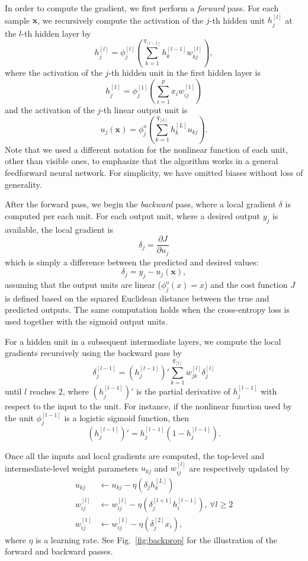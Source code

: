 \documentclass[dissertation,nocontribution,draft*]{aaltoseries}
\newcommand{\qlay}[1]{\left[#1\right]}
\newcommand{\vect}[1]{\mathbf{#1}}
\newcommand{\vx}[0]{\vect{x}}
\begin{document}
In order to compute the gradient, we first perform a
\textit{forward} pass. For each sample $\vx$, we recursively
compute the activation of the $j$-th hidden unit
$h_j^{\qlay{l}}$
at the $l$-th hidden layer by
\[
h_j^{\qlay{l}} = \phi_j^{\qlay{l}}
\left(\sum_{k=1}^{q_{\qlay{l-1}}} h_k^{\qlay{l-1}}
w_{kj}^{\qlay{l}}\right),
\]
where the activation of the $j$-th hidden unit in the first
hidden layer is
\[
h_j^{\qlay{1}} = \phi_j^{\qlay{1}} \left(\sum_{i=1}^p x_i
w_{ij}^{\qlay{1}}\right)
\]
and the activation of the $j$-th linear output unit is 
\[
u_j(\vx) = \phi_j^{o} \left( \sum_{k=1}^{q_{\qlay{L}}}
h_{k}^{\qlay{L}} u_{kj}
\right).
\]
Note that we used a different notation for the nonlinear
function of each unit, other than visible ones, to emphasize
that the algorithm works in a general feedforward neural
network. 
For simplicity, we have omitted biases without loss of
generality.

After the forward pass, we begin the \textit{backward} pass,
where a local gradient $\delta$ is computed per each unit.
For each output unit, where a desired output $y_j$ is
available, the local gradient is
\[
\delta_j = \frac{\partial J}{\partial u_j} 
\]
which is simply a difference between the predicted and
desired values:
\[
\delta_j = y_j - u_j(\vx),
\]
assuming that the output units are linear
($\phi_j^o(x) = x$) and the cost function $J$ is defined
based on the squared Euclidean distance between the true and
predicted outputs. The same computation holds when the
cross-entropy loss is used together with the sigmoid output
units.

For a hidden unit in a subsequent intermediate layers, we
compute the local gradients recursively using the backward
pass
by
\[
\delta_j^{\qlay{l-1}} = \left(h_j^{\qlay{l-1}}\right)'
\sum_{k=1}^{q_{\qlay{l}}}
w_{jk}^{\qlay{l}} \delta_j^{\qlay{l}}
\]
until $l$ reaches $2$, where $\left(h_j^{\qlay{l-1}}\right)'$ is
the partial derivative of $h_j^{\qlay{l-1}}$ with respect to the
input to the unit. For instance, if the nonlinear function
used by the unit $\phi_j^{\qlay{l-1}}$ is a logistic sigmoid
function, then
\[
\left(h_j^{\qlay{l-1}}\right)' = h_j^{\qlay{l-1}} \left( 1 -
h_j^{\qlay{l-1}} \right).
\]

Once all the inputs and local gradients are computed, the
top-level and intermediate-level weight parameters $u_{kj}$
and $w_{ij}^{\qlay{l}}$ are respectively updated by
\begin{align}
    \label{eq:backprop}
    u_{kj} &\leftarrow u_{kj} - \eta \left( \delta_j
    h_k^{\qlay{L}}
    \right) 
    \nonumber \\
    w_{ij}^{\qlay{l}} &\leftarrow w_{ij}^{\qlay{l}} - \eta \left(
    \delta_j^{\qlay{l+1}} h_i^{\qlay{l-1}}\right) \text{, }\forall l \geq 2 
    \nonumber \\
    w_{ij}^{\qlay{1}} &\leftarrow w_{ij}^{\qlay{1}} - \eta \left(
    \delta_j^{\qlay{2}} x_i
    \right),
\end{align}
where $\eta$ is a learning rate. See Fig.~\ref{fig:backprop}
for the illustration of the forward and backward passes.
\end{document}
